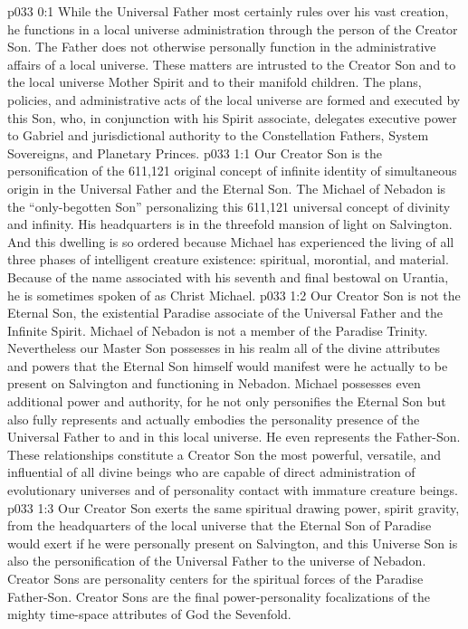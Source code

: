 \author{Chief of Archangels}
\vs p033 0:1 While the Universal Father most certainly rules over his vast creation, he functions in a local universe administration through the person of the Creator Son. The Father does not otherwise personally function in the administrative affairs of a local universe. These matters are intrusted to the Creator Son and to the local universe Mother Spirit and to their manifold children. The plans, policies, and administrative acts of the local universe are formed and executed by this Son, who, in conjunction with his Spirit associate, delegates executive power to Gabriel and jurisdictional authority to the Constellation Fathers, System Sovereigns, and Planetary Princes.
\vs p033 1:1 Our Creator Son is the personification of the 611,121 original concept of infinite identity of simultaneous origin in the Universal Father and the Eternal Son. The Michael of Nebadon is the “only\hyp{}begotten Son” personalizing this 611,121 universal concept of divinity and infinity. His headquarters is in the threefold mansion of light on Salvington. And this dwelling is so ordered because Michael has experienced the living of all three phases of intelligent creature existence: spiritual, morontial, and material. Because of the name associated with his seventh and final bestowal on Urantia, he is sometimes spoken of as Christ Michael.
\vs p033 1:2 Our Creator Son is not the Eternal Son, the existential Paradise associate of the Universal Father and the Infinite Spirit. Michael of Nebadon is not a member of the Paradise Trinity. Nevertheless our Master Son possesses in his realm all of the divine attributes and powers that the Eternal Son himself would manifest were he actually to be present on Salvington and functioning in Nebadon. Michael possesses even additional power and authority, for he not only personifies the Eternal Son but also fully represents and actually embodies the personality presence of the Universal Father to and in this local universe. He even represents the Father\hyp{}Son. These relationships constitute a Creator Son the most powerful, versatile, and influential of all divine beings who are capable of direct administration of evolutionary universes and of personality contact with immature creature beings.
\vs p033 1:3 Our Creator Son exerts the same spiritual drawing power, spirit gravity, from the headquarters of the local universe that the Eternal Son of Paradise would exert if he were personally present on Salvington, and  this Universe Son is also the personification of the Universal Father to the universe of Nebadon. Creator Sons are personality centers for the spiritual forces of the Paradise Father\hyp{}Son. Creator Sons are the final power\hyp{}personality focalizations of the mighty time\hyp{}space attributes of God the Sevenfold.
